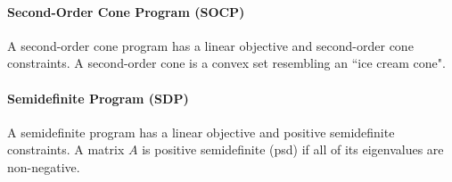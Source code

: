 \documentclass[12pt]{article}
\begin{document}
	\paragraph{Second-Order Cone Program (SOCP)} A second-order cone program has a linear objective and second-order cone constraints.  A second-order cone is a convex set resembling an ``ice cream cone".
	
	\paragraph{Semidefinite Program (SDP)} A semidefinite program has a linear objective and positive semidefinite constraints.  A matrix \( A \) is positive semidefinite (psd) if all of its eigenvalues are non-negative.
\end{document}
